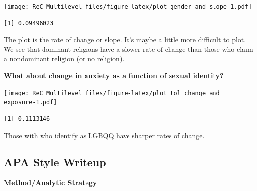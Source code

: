 \documentclass[
  english,
]{book}
\newenvironment{Shaded}{\begin{snugshade}}{\end{snugshade}}
\newcommand{\AttributeTok}[1]{\textcolor[rgb]{0.77,0.63,0.00}{#1}}
\newcommand{\FunctionTok}[1]{\textcolor[rgb]{0.00,0.00,0.00}{#1}}
\newcommand{\NormalTok}[1]{#1}
\newcommand{\SpecialCharTok}[1]{\textcolor[rgb]{0.00,0.00,0.00}{#1}}
\newcommand{\StringTok}[1]{\textcolor[rgb]{0.31,0.60,0.02}{#1}}
\begin{document}
\texttt{[image: ReC\_Multilevel\_files/figure-latex/plot gender and slope-1.pdf]}

\begin{Shaded}
\end{Shaded}

\begin{verbatim}
[1] 0.09496023
\end{verbatim}

The plot is the rate of change or slope. It's maybe a little more difficult to plot. We see that dominant religions have a slower rate of change than those who claim a nondominant religion (or no religion).

\textbf{What about change in anxiety as a function of sexual identity?}

\begin{Shaded}
\end{Shaded}

\texttt{[image: ReC\_Multilevel\_files/figure-latex/plot tol change and exposure-1.pdf]}

\begin{Shaded}
\end{Shaded}

\begin{verbatim}
[1] 0.1113146
\end{verbatim}

Those with who identify as LGBQQ have sharper rates of change.

\hypertarget{apa-style-writeup-1}{%
\subsection{APA Style Writeup}\label{apa-style-writeup-1}}

\textbf{Method/Analytic Strategy}
\end{document}
